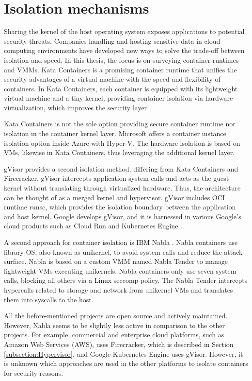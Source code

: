 \section{Isolation mechanisms}
\label{section:isolation}

Sharing the kernel of the host operating system exposes applications to potential security threats. Companies handling and hosting sensitive data in cloud computing environments have developed new ways to solve the trade-off between isolation and speed. In this thesis, the focus is on surveying container runtimes and VMMs. Kata Containers is a promising container runtime that unifies the security advantages of a virtual machine with the speed and flexibility of containers. In Kata Containers, each container is equipped with its lightweight virtual machine and a tiny kernel, providing container isolation via hardware virtualization, which improves the security layer \cite{Kumar2020}.

Kata Containers is not the sole option providing secure container runtime nor isolation in the container kernel layer. Microsoft offers a container instance isolation option inside Azure with Hyper-V. The hardware isolation is based on VMs, likewise in Kata Containers, thus leveraging the additional kernel layer. \cite{Hyper-V}

gVisor provides a second isolation method, differing from Kata Containers and Firecracker. gVisor intercepts application system calls and acts as the guest kernel without translating through virtualized hardware. Thus, the architecture can be thought of as a merged kernel and hypervisor. gVisor includes OCI runtime runsc, which provides the isolation boundary between the application and host kernel. Google develops gVisor, and it is harnessed in various Google's cloud products such as Cloud Run \cite{CloudRun} and Kubernetes Engine \cite{GKE}. \cite{Debab2021}\cite{gVisor}

A second approach for container isolation is IBM Nabla \cite{Nabla}. Nabla containers use library OS, also known as unikernel, to avoid system calls and reduce the attack surface. Nabla is based on a custom VMM named Nabla Tender to manage lightweight VMs executing unikernels. Nabla containers only use seven system calls, blocking all others via a Linux seccomp policy. The Nabla Tender intercepts hypercalls related to storage and network from unikernel VMs and translates them into syscalls to the host. \cite{Debab2021}

All the before-mentioned projects are open source and actively maintained. However, Nabla seems to be slightly less active in comparison to the other projects. For example, commercial and enterprise cloud platforms, such as Amazon Web Services (AWS), uses Firecracker, which is described in Section \ref{subsection:Hypervisor}, and Google Kubernetes Engine uses gVisor. However, it is unknown which approaches are used in the other platforms to isolate containers for security reasons.

